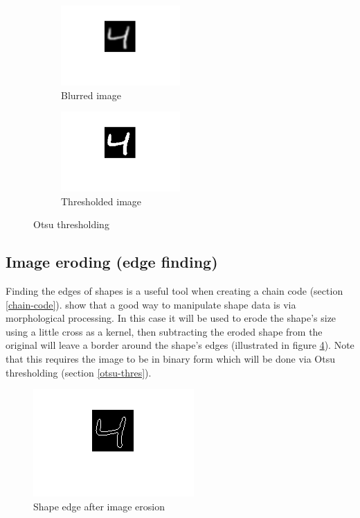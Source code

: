 \documentclass[12pt]{article}
\begin{document}
    \begin{figure}[H]
      \begin{subfigure}{.5\textwidth}
        \centering
        \includegraphics[width=0.5\textwidth]{blurred}
        \caption{Blurred image}
        \label{fig:blurred-2}
      \end{subfigure}
      \begin{subfigure}{.5\textwidth}
        \centering
        \includegraphics[width=0.5\textwidth]{ohtsu}
        \caption{Thresholded image}
        \label{fig:ohtsu}
      \end{subfigure}
      \caption{Otsu thresholding}
      \label{fig:otsu-threshold}
    \end{figure}

  \subsection{Image eroding (edge finding)} \label{eroded}
    Finding the edges of shapes is a useful tool when creating a chain code (section \ref{chain-code}). \cite{haralick1987image} show that a good way to manipulate shape data is via morphological processing. In this case it will be used to erode the shape's size using a little cross as a kernel, then subtracting the eroded shape from the original will leave a border around the shape's edges (illustrated in figure \ref{fig:eroded}). Note that this requires the image to be in binary form which will be done via Otsu thresholding (section \ref{otsu-thres}).

    \begin{figure}[H]
      \centering
      \includegraphics[width=0.25\linewidth]{edge}
      \caption{Shape edge after image erosion}
      \label{fig:eroded}
    \end{figure}
\end{document}
